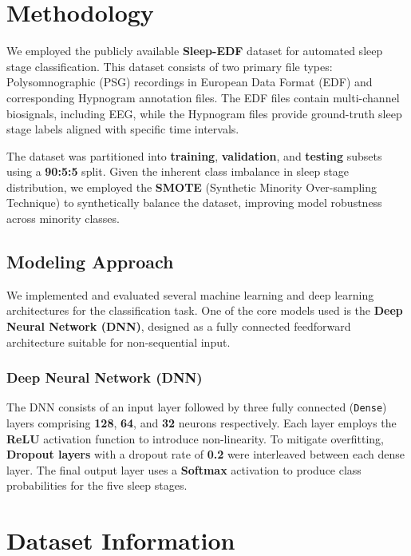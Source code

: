 
\section{Methodology}



We employed the publicly available \textbf{Sleep-EDF} dataset for automated sleep stage classification. This dataset consists of two primary file types: Polysomnographic (PSG) recordings in European Data Format (EDF) and corresponding Hypnogram annotation files. The EDF files contain multi-channel biosignals, including EEG, while the Hypnogram files provide ground-truth sleep stage labels aligned with specific time intervals.



The dataset was partitioned into \textbf{training}, \textbf{validation}, and \textbf{testing} subsets using a \textbf{90:5:5} split. Given the inherent class imbalance in sleep stage distribution, we employed the \textbf{SMOTE} (Synthetic Minority Over-sampling Technique) to synthetically balance the dataset, improving model robustness across minority classes.

\subsection{Modeling Approach}

We implemented and evaluated several machine learning and deep learning architectures for the classification task. One of the core models used is the \textbf{Deep Neural Network (DNN)}, designed as a fully connected feedforward architecture suitable for non-sequential input.

\subsubsection{Deep Neural Network (DNN)}

The DNN consists of an input layer followed by three fully connected (\texttt{Dense}) layers comprising \textbf{128}, \textbf{64}, and \textbf{32} neurons respectively. Each layer employs the \textbf{ReLU} activation function to introduce non-linearity. To mitigate overfitting, \textbf{Dropout layers} with a dropout rate of \textbf{0.2} were interleaved between each dense layer. The final output layer uses a \textbf{Softmax} activation to produce class probabilities for the five sleep stages.




\section{Dataset Information}


